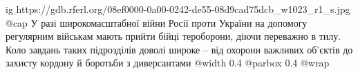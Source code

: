  
 
 
 
 

\ifcmt
  ig https://gdb.rferl.org/08ef0000-0a00-0242-de55-08d9cad75dcb_w1023_r1_s.jpg
  @cap У разі широкомасштабної війни Росії проти України на допомогу регулярним військам мають прийти бійці тероборони, діючи переважно в тилу. Коло завдань таких підрозділів доволі широке – від охорони важливих об'єктів до захисту кордону й боротьби з диверсантами
  @width 0.4
  @parbox 0.4
  @wrap \parpic[r]
\fi
